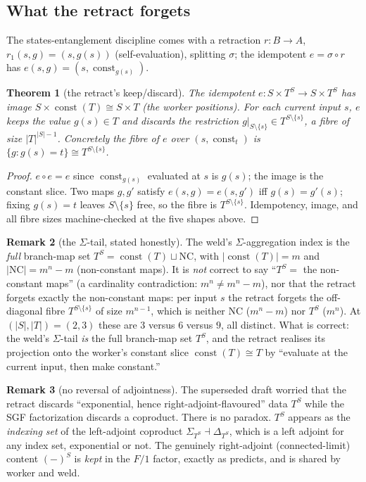 \documentclass[11pt]{amsart}
\theoremstyle{plain}
\newtheorem{theorem}{Theorem}[section]
\theoremstyle{definition}
\newtheorem{remark}[theorem]{Remark}
\DeclareMathOperator{\const}{const}
\begin{document}
\subsection*{What the retract forgets}
The states-entanglement discipline comes with a retraction $r\colon B\to A$,
$r_1(s,g)=(s,g(s))$ (self-evaluation), splitting $\sigma$; the idempotent $e=\sigma\circ r$
has $e(s,g)=(s,\const_{g(s)})$.

\begin{theorem}[the retract's keep/discard]\label{thm:retract}
The idempotent $e\colon S\times T^{S}\to S\times T^{S}$ has image $S\times\const(T)\cong
S\times T$ (the worker positions). For each current input $s$, $e$ keeps the value
$g(s)\in T$ and discards the restriction $g|_{S\setminus\{s\}}\in T^{S\setminus\{s\}}$, a
fibre of size $|T|^{|S|-1}$. Concretely the fibre of $e$ over $(s,\const_t)$ is
$\{g:g(s)=t\}\cong T^{S\setminus\{s\}}$.
\end{theorem}

\begin{proof}
$e\circ e=e$ since $\const_{g(s)}$ evaluated at $s$ is $g(s)$; the image is the constant
slice. Two maps $g,g'$ satisfy $e(s,g)=e(s,g')$ iff $g(s)=g'(s)$; fixing $g(s)=t$ leaves
$S\setminus\{s\}$ free, so the fibre is $T^{S\setminus\{s\}}$. Idempotency, image, and all
fibre sizes machine-checked at the five shapes above.
\end{proof}

\begin{remark}[the $\Sigma$-tail, stated honestly]\label{rem:tail}
The weld's $\Sigma$-aggregation index is the \emph{full} branch-map set
$T^{S}=\const(T)\sqcup\mathrm{NC}$, with $|\const(T)|=m$ and $|\mathrm{NC}|=m^{n}-m$
(non-constant maps). It is \emph{not} correct to say ``$T^{S}=$ the non-constant maps''
(a cardinality contradiction: $m^{n}\ne m^{n}-m$), nor that the retract forgets exactly the
non-constant maps: per input $s$ the retract forgets the off-diagonal fibre
$T^{S\setminus\{s\}}$ of size $m^{n-1}$, which is neither $\mathrm{NC}$ ($m^{n}-m$) nor $T^{S}$
($m^{n}$). At $(|S|,|T|)=(2,3)$ these are $3$ versus $6$ versus $9$, all distinct. What is
correct: the weld's $\Sigma$-tail \emph{is} the full branch-map set $T^{S}$, and the retract
realises its projection onto the worker's constant slice $\const(T)\cong T$ by ``evaluate at
the current input, then make constant.''
\end{remark}

\begin{remark}[no reversal of adjointness]\label{rem:no-reversal}
The superseded draft worried that the retract discards ``exponential, hence
right-adjoint-flavoured'' data $T^{S}$ while the SGF factorization discards a coproduct.
There is no paradox. $T^{S}$ appears as the \emph{indexing set} of the left-adjoint coproduct
$\Sigma_{T^{S}}\dashv\Delta_{T^{S}}$, which is a left adjoint for any index set, exponential or
not. The genuinely right-adjoint (connected-limit) content $(-)^{S}$ is \emph{kept} in the
$F/1$ factor, exactly as \cite{SGF} predicts, and is shared by worker and weld.
\end{remark}
\end{document}
